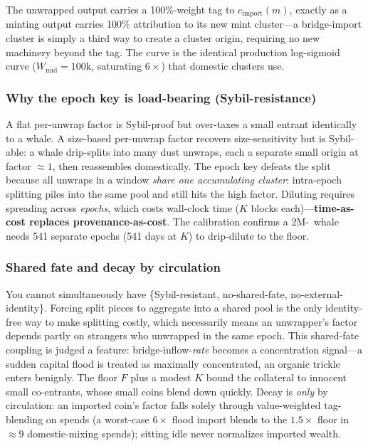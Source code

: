 The unwrapped output carries a 100\%-weight tag to $c_{\mathrm{import}}(m)$,
exactly as a minting output carries 100\% attribution to its new mint
cluster---a bridge-import cluster is simply a third way to create a cluster
origin, requiring no new machinery beyond the tag. The curve is the identical
production log-sigmoid curve ($W_{\mathrm{mid}} = 100\text{k}$, saturating
$6\times$) that domestic clusters use.

\subsubsection{Why the epoch key is load-bearing (Sybil-resistance)}

A flat per-unwrap factor is Sybil-proof but over-taxes a small entrant
identically to a whale. A size-based per-unwrap factor recovers size-sensitivity
but is Sybil-able: a whale drip-splits into many dust unwraps, each a separate
small origin at factor $\approx 1$, then reassembles domestically. The epoch key
defeats the split because all unwraps in a window \emph{share one accumulating
cluster}: intra-epoch splitting piles into the same pool and still hits the high
factor. Diluting requires spreading across \emph{epochs}, which costs wall-clock
time ($K$ blocks each)---\textbf{time-as-cost replaces provenance-as-cost}. The
calibration confirms a 2M-\BTH\ whale needs 541 separate epochs (541 days at
$K$) to drip-dilute to the floor.

\subsubsection{Shared fate and decay by circulation}

You cannot simultaneously have \{Sybil-resistant, no-shared-fate,
no-external-identity\}. Forcing split pieces to aggregate into a shared pool is
the only identity-free way to make splitting costly, which necessarily means an
unwrapper's factor depends partly on strangers who unwrapped in the same epoch.
This shared-fate coupling is judged a feature: bridge-inflow-\emph{rate} becomes
a concentration signal---a sudden capital flood is treated as maximally
concentrated, an organic trickle enters benignly. The floor $F$ plus a modest
$K$ bound the collateral to innocent small co-entrants, whose small coins blend
down quickly. Decay is \emph{only} by circulation: an imported coin's factor
falls solely through value-weighted tag-blending on spends (a worst-case
$6\times$ flood import blends to the $1.5\times$ floor in $\approx 9$
domestic-mixing spends); sitting idle never normalizes imported wealth.

